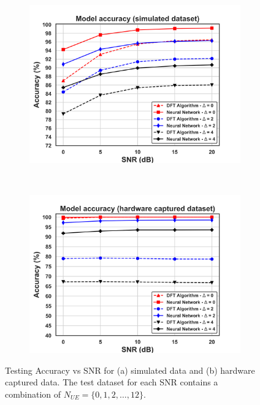 \documentclass[journal]{IEEEtran}
\begin{document}
\begin{figure}[ht!]
    \captionsetup{justification=justified}
     \centering
     \begin{subfigure}[b]{0.48\textwidth}
         \centering
         \includegraphics[width=\textwidth]{Figures/Acc_vs_SNR_FCN_3_512_1638k_train_sim_test_sim_in_sz_25_3_layers_512_512_512_nns_out_sz_12_fading_SNR_10dB_slots_13_mux_ue_0__12_epochs_150.png}
         \caption{}
         \label{fig: acc_vs_snr_sim}
     \end{subfigure}
     \\
     \begin{subfigure}[b]{0.48\textwidth}
         \centering
         \includegraphics[width=\textwidth]{Figures/Acc_vs_SNR_FCN_3_512_1638k_train_sim_test_hw_in_sz_25_3_layers_512_512_512_nns_out_sz_12_fading_SNR_10dB_slots_13_mux_ue_0__12_epochs_150.png}
         \caption{}
         \label{fig: acc_vs_snr_hw}
     \end{subfigure}
        \caption{Testing Accuracy vs SNR for (a) simulated data and (b) hardware captured data. The test dataset for each SNR contains a combination of $N_{UE} = \{0, 1, 2, \dots, 12\}$.}
        \label{fig: acc_vs_snr}
\end{figure}
\end{document}
